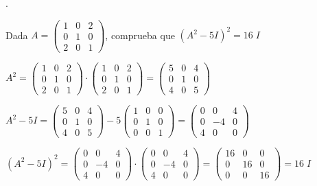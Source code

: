 \begin{ejre}.

	Dada $A=\left( \begin{matrix} 1&0&2\\0&1&0\\2&0&1 \end{matrix} \right)$, comprueba que $(A^2-5I)^2=16\; I$
\end{ejre}
\begin{proofw}\renewcommand{\qedsymbol}{$\diamond$}


\noindent $A^2=\left( \begin{matrix} 1&0&2\\0&1&0\\2&0&1 \end{matrix} \right)	\cdot \left( \begin{matrix} 1&0&2\\0&1&0\\2&0&1 \end{matrix} \right)=
\left( \begin{matrix} 5&0&4\\0&1&0\\4&0&5 \end{matrix} \right)$

\noindent $A^2-5I=\left( \begin{matrix} 5&0&4\\0&1&0\\4&0&5 \end{matrix} \right)-5\left( \begin{matrix} 1&0&0\\0&1&0\\0&0&1 \end{matrix} \right)=
\left( \begin{matrix} 0&0&4\\0&-4&0\\4&0&0 \end{matrix} \right)	$

\noindent $(A^2-5I)^2=\left( \begin{matrix} 0&0&4\\0&-4&0\\4&0&0 \end{matrix} \right)\cdot \left( \begin{matrix} 0&0&4\\0&-4&0\\4&0&0 \end{matrix} \right)=\left( \begin{matrix} 16&0&0\\0&16&0\\0&0&16 \end{matrix} \right)=16\; I$
\end{proofw}

